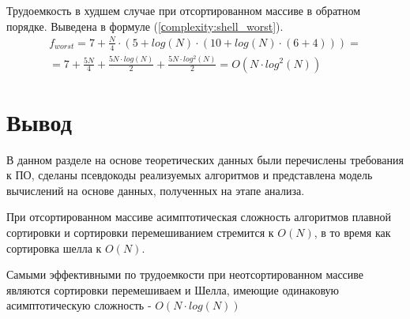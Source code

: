 Трудоемкость в худшем случае при отсортированном массиве в обратном порядке. Выведена в формуле (\ref{сomplexity:shell_worst}).
\begin{equation}
	\label{сomplexity:shell_worst}
	\begin{gathered}
		f_{worst} = 7 + \frac{N}{4} \cdot (5 + log(N) \cdot (10 + log(N) \cdot (6 + 4))) =\\
		= 7 + \frac{5N}{4} + \frac{5N \cdot log(N)}{2} + \frac{5N \cdot log^2(N)}{2} = O(N \cdot log^2(N))
	\end{gathered}
\end{equation}

\section*{Вывод}

В данном разделе на основе теоретических данных были перечислены требования к ПО, сделаны псевдокоды реализуемых алгоритмов и представлена модель вычислений на основе данных, полученных на этапе анализа.

При отсортированном массиве асимптотическая сложность алгоритмов плавной сортировки и сортировки перемешиванием стремится к $O(N)$, в то время как сортировка шелла к $O(N)$.

Самыми эффективными по трудоемкости при неотсортированном массиве являются сортировки перемешиваем и Шелла, имеющие одинаковую асимптотическую сложность -  $O(N \cdot log(N))$


\clearpage